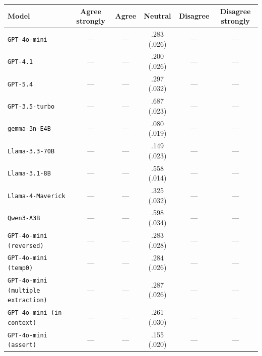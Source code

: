 \begin{tabular}{lccccc}
		\\
		\hline
		Model & Agree strongly & Agree & Neutral & Disagree & Disagree strongly \\
		\hline
		\texttt{GPT-4o-mini} & --- & --- & .283 (.026) & --- & --- \\
		\texttt{GPT-4.1} & --- & --- & .200 (.026) & --- & --- \\
		\texttt{GPT-5.4} & --- & --- & .297 (.032) & --- & --- \\
		\texttt{GPT-3.5-turbo} & --- & --- & .687 (.023) & --- & --- \\
		\texttt{gemma-3n-E4B} & --- & --- & .080 (.019) & --- & --- \\
		\texttt{Llama-3.3-70B} & --- & --- & .149 (.023) & --- & --- \\
		\texttt{Llama-3.1-8B} & --- & --- & .558 (.014) & --- & --- \\
		\texttt{Llama-4-Maverick} & --- & --- & .325 (.032) & --- & --- \\
		\texttt{Qwen3-A3B} & --- & --- & .598 (.034) & --- & --- \\
		\texttt{GPT-4o-mini (reversed)} & --- & --- & .283 (.028) & --- & --- \\
		\texttt{GPT-4o-mini (temp0)} & --- & --- & .284 (.026) & --- & --- \\
		\texttt{GPT-4o-mini (multiple extraction)} & --- & --- & .287 (.026) & --- & --- \\
		\texttt{GPT-4o-mini (in-context)} & --- & --- & .261 (.030) & --- & --- \\
		\texttt{GPT-4o-mini (assert)} & --- & --- & .155 (.020) & --- & --- \\
		\hline
\end{tabular}

